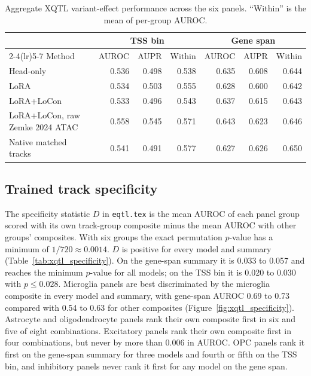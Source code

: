 \documentclass[11pt]{article}
\begin{document}
\begin{table}[ht]
\centering
\scriptsize
\caption{Aggregate XQTL variant-effect performance across the six panels.
``Within'' is the mean of per-group AUROC.}
\label{tab:xqtl_performance}
\begin{tabular}{@{}lrrrrrr@{}}
\toprule
 & \multicolumn{3}{c}{TSS bin} & \multicolumn{3}{c}{Gene span} \\
\cmidrule(lr){2-4}\cmidrule(lr){5-7}
Method & AUROC & AUPR & Within & AUROC & AUPR & Within \\
\midrule
Head-only & 0.536 & 0.498 & 0.538 & 0.635 & 0.608 & 0.644 \\
LoRA & 0.534 & 0.503 & 0.555 & 0.628 & 0.600 & 0.642 \\
LoRA+LoCon & 0.533 & 0.496 & 0.543 & 0.637 & 0.615 & 0.643 \\
LoRA+LoCon, raw Zemke 2024 ATAC & 0.558 & 0.545 & 0.571 & 0.643 & 0.623 & 0.646 \\
Native matched tracks & 0.541 & 0.491 & 0.577 & 0.627 & 0.626 & 0.650 \\
\bottomrule
\end{tabular}
\end{table}

\subsection{Trained track specificity}
The specificity statistic $D$ in \texttt{eqtl.tex} is the mean AUROC of each
panel group scored with its own track-group composite minus the mean AUROC
with other groups' composites. With six groups the exact permutation $p$-value
has a minimum of $1/720\approx 0.0014$. $D$ is positive for every model and
summary (Table~\ref{tab:xqtl_specificity}). On the gene-span summary it is
0.033 to 0.057 and reaches the minimum $p$-value for all models; on the TSS
bin it is 0.020 to 0.030 with $p\le 0.028$. Microglia panels are best
discriminated by the microglia composite in every model and summary, with
gene-span AUROC 0.69 to 0.73 compared with 0.54 to 0.63 for other composites
(Figure~\ref{fig:xqtl_specificity}). Astrocyte and oligodendrocyte panels rank
their own composite first in six and five of eight combinations. Excitatory
panels rank their own composite first in four combinations, but never by more
than 0.006 in AUROC. OPC panels rank it first on the gene-span summary for
three models and fourth or fifth on the TSS bin, and inhibitory panels never
rank it first for any model on the gene span.
\end{document}

